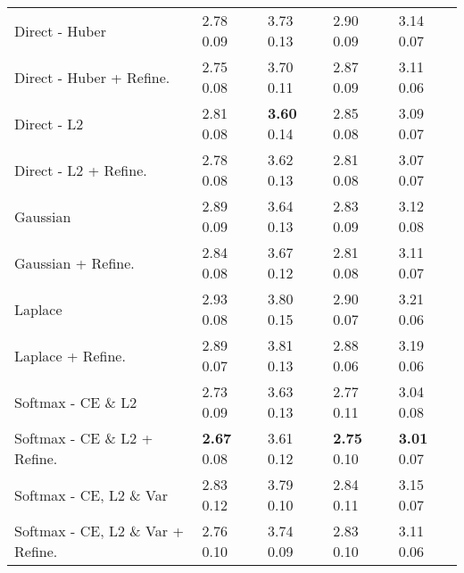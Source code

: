 \documentclass[runningheads]{llncs}
\begin{document}
\begin{appendices}
\begin{table*}[t]
\begin{center}
\begin{tabular}{|l||l|l|l|l|}
\hline



















Direct - Huber                  &2.78           0.09   &3.73           0.13    &2.90           0.09    &3.14  0.07 \\
Direct - Huber + Refine.      &2.75  0.08   &3.70           0.11    &2.87           0.09    &3.11  0.06 \\
\hline

Direct - L2                   &2.81  0.08   &\textbf{3.60}  0.14    &2.85  0.08    &3.09  0.07 \\
Direct - L2 + Refine.      &2.78  0.08   &3.62  0.13    &2.81  0.08    &3.07  0.07 \\
\hline

Gaussian                               &2.89           0.09   &3.64  0.13    &2.83           0.09    &3.12  0.08 \\
Gaussian + Refine.                  &2.84           0.08   &3.67           0.12    &2.81  0.08    &3.11  0.07 \\
\hline

Laplace                             &2.93           0.08   &3.80           0.15    &2.90           0.07    &3.21  0.06 \\
Laplace + Refine.                &2.89           0.07   &3.81           0.13    &2.88           0.06    &3.19  0.06 \\
\hline



Softmax - CE \& L2                             &2.73  0.09   &3.63  0.13    &2.77  0.11    &3.04  0.08 \\
Softmax - CE \& L2 + Refine.                &\textbf{2.67}  0.08   &3.61  0.12    &\textbf{2.75}  0.10    &\textbf{3.01}  0.07 \\
\hline

Softmax - CE, L2 \& Var                             &2.83  0.12   &3.79  0.10    &2.84  0.11    &3.15  0.07 \\
Softmax - CE, L2 \& Var + Refine.                &2.76  0.10   &3.74  0.09    &2.83  0.10    &3.11  0.06 \\

\hline
\end{tabular}\vspace{-3.0mm}
\label{table:head_pose_estimation_full}
\end{center}
\end{table*}


\end{appendices}
\end{document}
